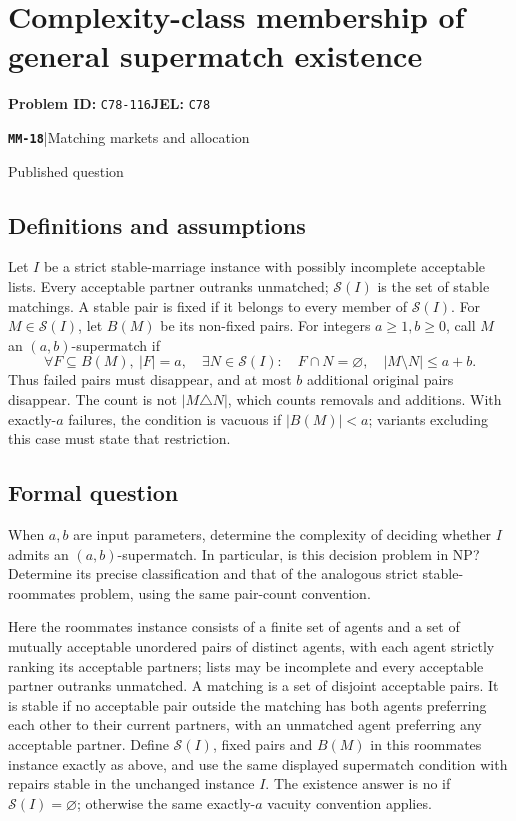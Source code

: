 \documentclass[11pt,a4paper]{article}
\newcommand{\entrymeta}[3]{{\sffamily\small\color{muted}\textbf{\texttt{#1}}\quad|\quad #2\par #3\par}}
\begin{document}
\section*{Complexity-class membership of general supermatch existence}
\textbf{Problem ID:} \texttt{C78-116}\quad \textbf{JEL:} \texttt{C78}\par
\label{problem:OP-0559}
\label{beyond:MM-18}
\entrymeta{MM-18}{Matching markets and allocation}{Published question}
\subsection*{Definitions and assumptions}
Let $I$ be a strict stable-marriage instance with possibly incomplete acceptable lists. Every acceptable partner outranks unmatched; $\mathcal S(I)$ is the set of stable matchings. A stable pair is fixed if it belongs to every member of $\mathcal S(I)$. For $M\in\mathcal S(I)$, let $B(M)$ be its non-fixed pairs. For integers $a\ge1,b\ge0$, call $M$ an $(a,b)$-supermatch if
\[
 \forall F\subseteq B(M),\ |F|=a,\quad
 \exists N\in\mathcal S(I):\quad
 F\cap N=\varnothing,\quad |M\setminus N|\le a+b.
\]
Thus failed pairs must disappear, and at most $b$ additional original pairs disappear. The count is not $|M\triangle N|$, which counts removals and additions. With exactly-$a$ failures, the condition is vacuous if $|B(M)|<a$; variants excluding this case must state that restriction.
\subsection*{Formal question}
When $a,b$ are input parameters, determine the complexity of deciding whether $I$ admits an $(a,b)$-supermatch. In particular, is this decision problem in NP? Determine its precise classification and that of the analogous strict stable-roommates problem, using the same pair-count convention.

Here the roommates instance consists of a finite set of agents and a set of mutually acceptable unordered pairs of distinct agents, with each agent strictly ranking its acceptable partners; lists may be incomplete and every acceptable partner outranks unmatched. A matching is a set of disjoint acceptable pairs. It is stable if no acceptable pair outside the matching has both agents preferring each other to their current partners, with an unmatched agent preferring any acceptable partner. Define $\mathcal S(I)$, fixed pairs and $B(M)$ in this roommates instance exactly as above, and use the same displayed supermatch condition with repairs stable in the unchanged instance $I$. The existence answer is no if $\mathcal S(I)=\varnothing$; otherwise the same exactly-$a$ vacuity convention applies.
\end{document}
